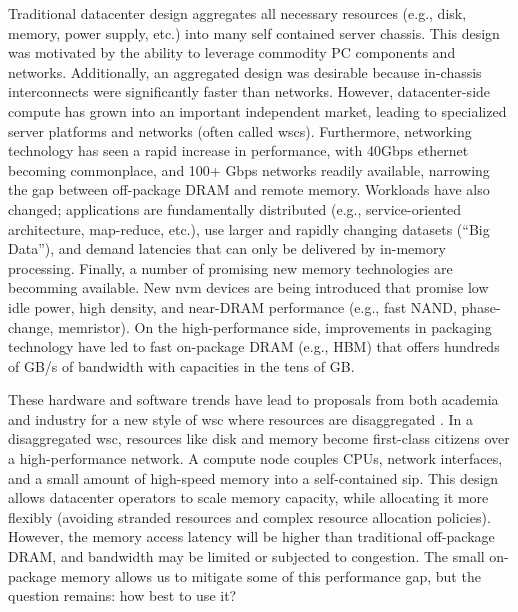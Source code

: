 Traditional datacenter design aggregates all necessary resources (e.g., disk,
memory, power supply, etc.) into many self contained server chassis. This
design was motivated by the ability to leverage commodity PC components and
networks\cite{NOW}.  Additionally, an aggregated design was desirable because
in-chassis interconnects were significantly faster than networks. However,
datacenter-side compute has grown into an important independent market, leading
to specialized server platforms and networks (often called \glspl{wsc}).
Furthermore, networking technology has seen a rapid increase in performance,
with 40Gbps ethernet becoming commonplace, and 100+ Gbps networks readily
available, narrowing the gap between off-package DRAM and remote
memory.
Workloads have also changed; applications are fundamentally distributed (e.g.,
service-oriented architecture, map-reduce, etc.), use larger and rapidly
changing datasets (``Big Data''), and demand latencies that can only be
delivered by in-memory processing. Finally, a number of promising new memory
technologies are becomming available. New \gls{nvm} devices are being
introduced that promise low idle power, high density, and near-DRAM performance
(e.g., fast NAND, phase-change, memristor). On the high-performance side,
improvements in packaging technology have led to fast on-package DRAM (e.g.,
HBM) that offers hundreds of GB/s of bandwidth with capacities in the tens of
GB.

These hardware and software trends have lead to proposals from both
academia\cite{firebox}\cite{dredbox} and
industry\cite{themachine}\cite{huaweidc30}\cite{intelrsa}\cite{fbdisag} for a
new style of \gls{wsc} where resources are disaggregated .  In a
disaggregated \gls{wsc}, resources like disk and memory become first-class
citizens over a high-performance network. A compute node couples CPUs, network
interfaces, and a small amount of high-speed memory into a self-contained
\gls{sip}. This design allows datacenter operators to scale memory capacity,
while allocating it more flexibly (avoiding stranded resources and complex
resource allocation policies). However, the memory access latency will be
higher than traditional off-package DRAM, and bandwidth may be limited or
subjected to congestion. The small on-package memory allows us to mitigate some
of this performance gap, but the question remains: how best to use it?

